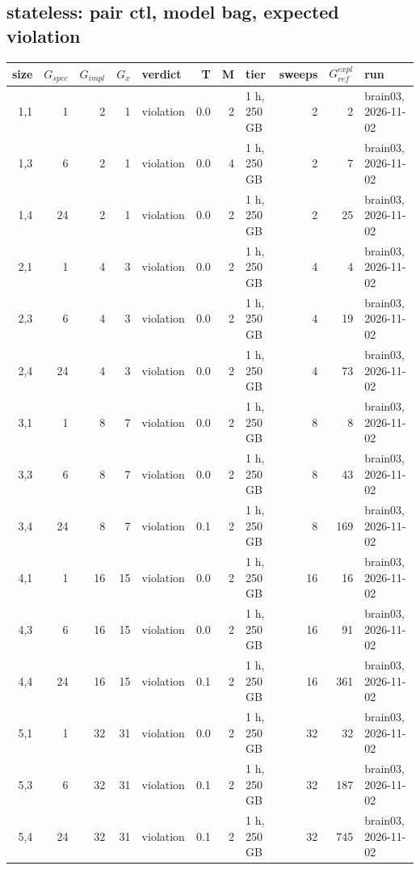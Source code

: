 \documentclass[10pt]{article}
\begin{document}
\subsection*{stateless: pair \textsf{ctl}, model bag, expected violation}
\begin{longtable}{@{}rrrrlrrlrrl@{}}
\toprule
size & $G_{\mathit{spec}}$ & $G_{\mathit{impl}}$ & $G_x$ & verdict & T & M & tier & sweeps & $G_{\mathit{ref}}^{\mathit{expl}}$ & run \\
\midrule
\endhead
\color{blue} 1,1 & 1 & 2 & 1 & violation & 0.0 & 2 & 1 h, 250 GB & 2 & 2 & brain03, 2026-11-02 \\
\color{blue} 1,3 & 6 & 2 & 1 & violation & 0.0 & 4 & 1 h, 250 GB & 2 & 7 & brain03, 2026-11-02 \\
\color{blue} 1,4 & 24 & 2 & 1 & violation & 0.0 & 2 & 1 h, 250 GB & 2 & 25 & brain03, 2026-11-02 \\
\color{blue} 2,1 & 1 & 4 & 3 & violation & 0.0 & 2 & 1 h, 250 GB & 4 & 4 & brain03, 2026-11-02 \\
\color{blue} 2,3 & 6 & 4 & 3 & violation & 0.0 & 2 & 1 h, 250 GB & 4 & 19 & brain03, 2026-11-02 \\
\color{blue} 2,4 & 24 & 4 & 3 & violation & 0.0 & 2 & 1 h, 250 GB & 4 & 73 & brain03, 2026-11-02 \\
\color{blue} 3,1 & 1 & 8 & 7 & violation & 0.0 & 2 & 1 h, 250 GB & 8 & 8 & brain03, 2026-11-02 \\
\color{blue} 3,3 & 6 & 8 & 7 & violation & 0.0 & 2 & 1 h, 250 GB & 8 & 43 & brain03, 2026-11-02 \\
\color{blue} 3,4 & 24 & 8 & 7 & violation & 0.1 & 2 & 1 h, 250 GB & 8 & 169 & brain03, 2026-11-02 \\
\color{blue} 4,1 & 1 & 16 & 15 & violation & 0.0 & 2 & 1 h, 250 GB & 16 & 16 & brain03, 2026-11-02 \\
\color{blue} 4,3 & 6 & 16 & 15 & violation & 0.0 & 2 & 1 h, 250 GB & 16 & 91 & brain03, 2026-11-02 \\
\color{blue} 4,4 & 24 & 16 & 15 & violation & 0.1 & 2 & 1 h, 250 GB & 16 & 361 & brain03, 2026-11-02 \\
\color{blue} 5,1 & 1 & 32 & 31 & violation & 0.0 & 2 & 1 h, 250 GB & 32 & 32 & brain03, 2026-11-02 \\
\color{blue} 5,3 & 6 & 32 & 31 & violation & 0.1 & 2 & 1 h, 250 GB & 32 & 187 & brain03, 2026-11-02 \\
\color{blue} 5,4 & 24 & 32 & 31 & violation & 0.1 & 2 & 1 h, 250 GB & 32 & 745 & brain03, 2026-11-02 \\

\end{longtable}
\end{document}
